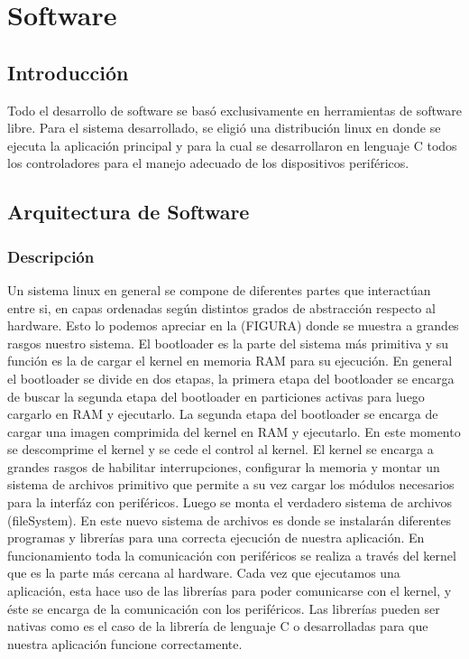 \chapter{Software}

\section{Introducción}
Todo el desarrollo de software se basó exclusivamente en herramientas de software libre. Para el sistema desarrollado, se eligió una distribución linux en donde se ejecuta la aplicación principal y para la cual se desarrollaron en lenguaje C todos los controladores para el manejo adecuado de los dispositivos periféricos.

\section{Arquitectura de Software}
\subsection{Descripción}
Un sistema linux en general se compone de diferentes partes que interactúan entre si, en capas ordenadas según distintos grados de abstracción respecto al hardware. Esto lo podemos apreciar en la (FIGURA) donde se muestra a grandes rasgos nuestro sistema. 
El bootloader es la parte del sistema más primitiva y su función es la de cargar el kernel en memoria RAM para su ejecución. En general el bootloader se divide en dos etapas, la primera etapa del bootloader se encarga de buscar la segunda etapa del bootloader en particiones activas para luego cargarlo en RAM y ejecutarlo. La segunda etapa del bootloader se encarga de cargar una imagen comprimida del kernel en RAM y ejecutarlo. En este momento se descomprime el kernel y se cede el control al kernel.
El kernel se encarga a grandes rasgos de habilitar interrupciones, configurar la memoria y montar un sistema de archivos primitivo que permite a su vez cargar los módulos necesarios para la interfáz con periféricos. Luego se monta el verdadero sistema de archivos (fileSystem). En este nuevo sistema de archivos es donde se instalarán diferentes programas y librerías para una correcta ejecución de nuestra aplicación.
En funcionamiento toda la comunicación con periféricos se realiza a través del kernel que es la parte más cercana al hardware.
Cada vez que ejecutamos una aplicación, esta hace uso de las librerías para poder comunicarse con el kernel, y éste se encarga de la comunicación con los periféricos. Las librerías pueden ser nativas como es el caso de la librería de lenguaje C o desarrolladas para que nuestra aplicación funcione correctamente.

